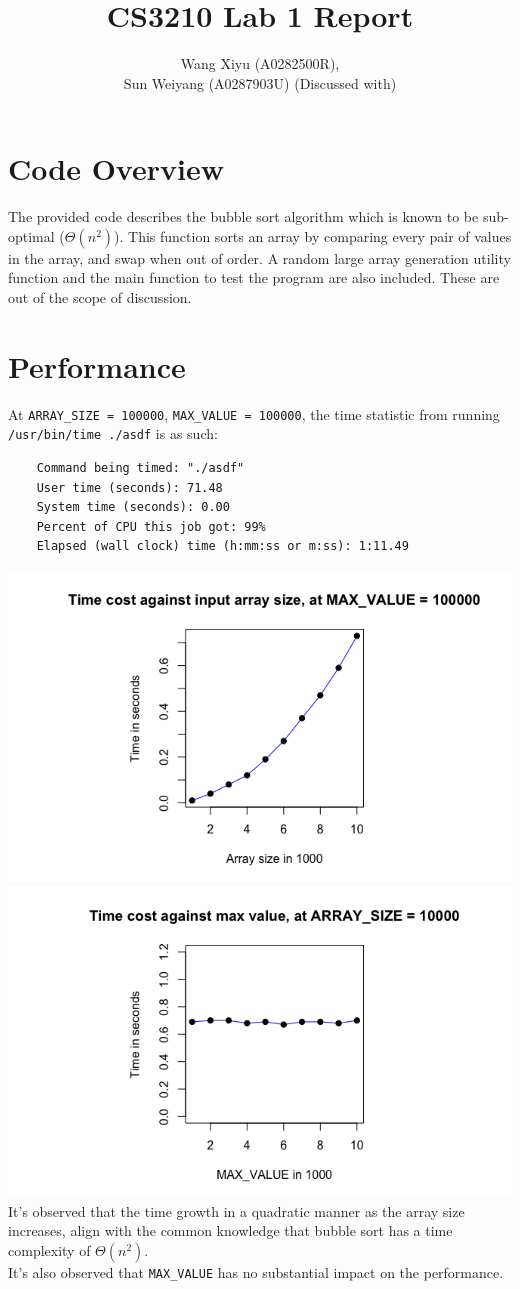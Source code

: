 \documentclass[a4paper]{article}
\begin{document}
\title{CS3210 Lab 1 Report}
\author{
  Wang Xiyu (A0282500R),\\ Sun Weiyang (A0287903U) (Discussed with)
}
\maketitle
\par\vspace{-2em}
\section{Code Overview}
\par\vspace{-0.5em}
The provided code describes the bubble sort algorithm which is known to be sub-optimal ($\Theta(n^2)$).
This function sorts an array by comparing every pair of values in the array, and swap when out of order.
A random large array generation utility function and the main function to test the program are also included. These are out of the scope of discussion.
\par\vspace{-1em}
\section{Performance}
\par\vspace{-0.5em}
At \texttt{ARRAY\_SIZE = 100000}, \texttt{MAX\_VALUE = 100000}, the time statistic from running \texttt{/usr/bin/time ./asdf} is as such:
\begin{lstlisting}
    Command being timed: "./asdf"
    User time (seconds): 71.48
    System time (seconds): 0.00
    Percent of CPU this job got: 99%
    Elapsed (wall clock) time (h:mm:ss or m:ss): 1:11.49
\end{lstlisting}
\noindent
\includegraphics[width=0.49\columnwidth]{000030.png}%
\hfill
\includegraphics[width=0.49\columnwidth]{000058.png}
It's observed that the time growth in a quadratic manner as the array size increases, align with the common knowledge that bubble sort has a time complexity of $\Theta(n^2)$.\\
It's also observed that \texttt{MAX\_VALUE} has no substantial impact on the performance.
\par\vspace{-1em}
\end{document}
